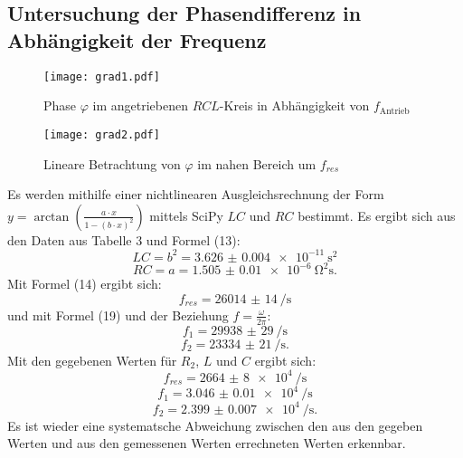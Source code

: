 \subsection{Untersuchung der Phasendifferenz in Abhängigkeit der Frequenz}
\begin{figure}[H]
	\centering
	\caption{Phase $\varphi$ im angetriebenen $RCL$-Kreis in Abhängigkeit von $f_{\text{Antrieb}}$ }
	\texttt{[image: grad1.pdf]}
	\label{fig:grad1}
\end{figure}
\begin{figure}[H]
	\centering
	\caption{Lineare Betrachtung von $\varphi$ im nahen Bereich um $f_{res}$}
	\texttt{[image: grad2.pdf]}
	\label{fig:grad2}
\end{figure}

Es werden mithilfe einer nichtlinearen Ausgleichsrechnung der Form $y=\arctan \left(\frac{a\cdot x}{1-(b\cdot x)^2}\right)$ mittels SciPy \cite{scipy} $LC$ und $RC$ bestimmt. Es ergibt sich aus den Daten aus Tabelle 3 und Formel (13):
\begin{displaymath}
LC = b^2 = \SI{3.626(4)e-11}{\second\squared}
\end{displaymath}
\begin{displaymath}
RC = a = \SI{1.505(10)e-6}{\ohm\squared\second}\text{.}
\end{displaymath}
Mit Formel (14) ergibt sich:
\begin{displaymath}
f_{res} = \SI{26014(14)}{\per\second}
\end{displaymath}
und mit Formel (19) und der Beziehung $f = \frac{\omega}{2\pi}$:
\begin{displaymath}
f_1 = \SI{29938(29)}{\per\second}
\end{displaymath}
\begin{displaymath}
f_2 = \SI{23334(21)}{\per\second}\text{.}
\end{displaymath}
Mit den gegebenen Werten für $R_2$, $L$ und $C$ ergibt sich:
\begin{displaymath}
f_{res} = \SI{2664(8)e4}{\per\second}
\end{displaymath}
\begin{displaymath}
f_1 = \SI{3.046(10)e4}{\per\second}
\end{displaymath}
\begin{displaymath}
f_2 = \SI{2.399(7)e4}{\per\second}\text{.}
\end{displaymath}
Es ist wieder eine systematsche Abweichung zwischen den aus den gegeben Werten und aus den gemessenen Werten errechneten Werten erkennbar.



